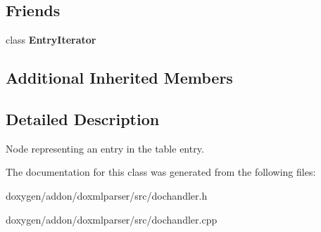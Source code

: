 \subsection*{Friends}
\begin{DoxyCompactItemize}
\item 
\mbox{\label{class_entry_handler_a9dcc4c9cf395c516267b6a3804c38c76}} 
class {\bfseries Entry\+Iterator}
\end{DoxyCompactItemize}
\subsection*{Additional Inherited Members}


\subsection{Detailed Description}
Node representing an entry in the table entry. 



The documentation for this class was generated from the following files\+:\begin{DoxyCompactItemize}
\item 
doxygen/addon/doxmlparser/src/dochandler.\+h\item 
doxygen/addon/doxmlparser/src/dochandler.\+cpp\end{DoxyCompactItemize}
